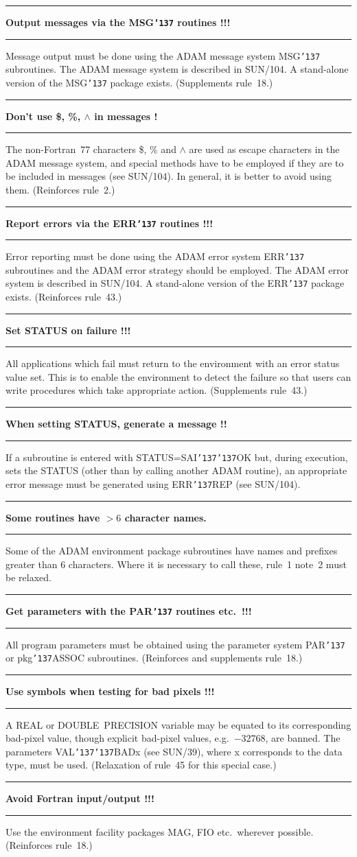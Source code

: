 \documentclass[twoside,11pt,nolof,noabs]{starlink}
\newcounter{sruleno}
\providecommand{\srule}[1]{
    \addtocounter{sruleno}{1}
    \goodbreak
    \rule{\textwidth}{0.3mm}
    \textbf{#1} \scpushright{ \textbf{\thesruleno}}
    \rule{\textwidth}{0.1mm}
}
\renewcommand{\_}{{\tt\char'137}}
\begin{document}
\srule{Output messages via the MSG\_ routines !!!}
Message output must be done using the ADAM message system MSG\_ subroutines.
The ADAM message system is described in SUN/104.  A stand-alone
version of the MSG\_ package exists.
(Supplements rule~18.)

\srule{Don't use \$, \%, $\wedge$ in messages !}
The non-Fortran~77 characters \$, \% and $\wedge$ are
used as escape characters in the ADAM message system, and
special methods have to be employed if they are to be included
in messages (see SUN/104).  In general, it is better to
avoid using them.
(Reinforces rule~2.)

\srule{Report errors via the ERR\_ routines !!!}
Error reporting must be done using the ADAM error system ERR\_ subroutines
and the ADAM error strategy should be employed.
The ADAM error system is described in SUN/104.   A stand-alone
version of the ERR\_ package exists.
(Reinforces rule~43.)

\srule{Set STATUS on failure !!!}
All applications which fail must return to the
environment with an error status value set.
This is to enable the environment to detect the failure so that users can
write procedures which take appropriate action.
(Supplements rule~43.)

\srule{When setting STATUS, generate a message !!}
If a subroutine is entered with STATUS=SAI\_\_OK
but, during execution,
sets the STATUS (other than by calling another ADAM routine),
an appropriate error message must be generated using ERR\_REP
(see SUN/104).

\srule{Some routines have $>6$ character names.}
Some of the ADAM environment package subroutines have names and prefixes
greater than 6 characters.
Where it is necessary to call these, rule~1 note~2 must be relaxed.

\srule{Get parameters with the PAR\_ routines etc.\ !!!}
All program parameters must be obtained using the parameter system PAR\_
or pkg\_ASSOC subroutines.
(Reinforces and supplements rule~18.)

\srule{Use symbols when testing for bad pixels !!!}
A REAL or DOUBLE~PRECISION variable may be equated to its corresponding
bad-pixel value, though explicit bad-pixel values, e.g.\ $-32768$, are banned.
The parameters VAL\_\_BADx
(see SUN/39), where x corresponds to the data type, must be
used.
(Relaxation of rule~45 for this special case.)

\srule{Avoid Fortran input/output !!!}
Use the environment facility packages MAG, FIO etc.\ wherever possible.
(Reinforces rule~18.)
\end{document}
